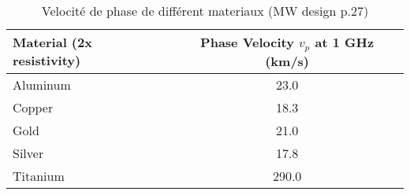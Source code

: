 \begin{table}
    \caption{Velocité de phase de différent materiaux (MW design p.27)}
    \label{tab:phase-velocity}
    \begin{tabular}{l|c}
        \toprule
        Material (2x resistivity) & \makecell{Phase Velocity\\$v_p$ at 1 GHz (km/s)} \\
        \midrule
        \hline
        Aluminum & 23.0 \\
        Copper & 18.3 \\
        Gold & 21.0 \\
        Silver & 17.8 \\
        Titanium & 290.0 \\
        \bottomrule
    \end{tabular}
\end{table}